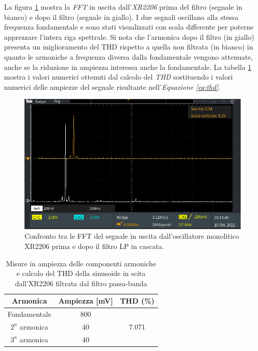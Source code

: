 \documentclass[titlepage]{report}
\begin{document}
	La figura \ref{fig:FFTxr+LP} mostra la \textit{FFT} in uscita dall'\textit{XR2206} prima del filtro (segnale in bianco) e dopo il filtro (segnale in giallo). I due segnali oscillano alla stessa frequenza fondamentale e sono stati visualizzati con scala differente per poterne apprezzare l'intera riga spettrale. Si nota che l'armonica dopo il filtro (in giallo) presenta un miglioramento del THD rispetto a quella non filtrata (in bianco) in quanto le armoniche a frequenza diversa dalla fondamentale vengono attenuate, anche se la riduzione in ampiezza interessa anche la fondamentale. La tabella \ref{tab:THD_XR2206+BP} mostra i valori numerici ottenuti dal calcolo del \textit{THD} sostituendo i valori numerici delle ampiezze del segnale risultante nell'\textit{Equazione \ref{eq:thd}}.

	\begin{figure}[H]
		\centering
		\includegraphics[scale=0.5]{Immagini/fft_xr+lp.PNG}
		\caption{Confronto tra le FFT del segnale in uscita dall'oscillatore monolitico XR2206 prima e dopo il filtro LP in cascata.}
		\label{fig:FFTxr+LP}
	\end{figure}


	\begin{table}[h!]
		\centering
		\begin{tabular}{||c|c|c||}
			\hline
			\cellcolor{gray!10}Armonica & \cellcolor{gray!10}Ampiezza [mV] & \cellcolor{gray!10}THD (\%) \\
			\hline
			Fondamentale & 800 &\\
			\cline{1-2}
			$2^a$ armonica & 40 & 7.071 \\
			\cline{1-2} 
			$3^a$ armonica & 40 & \\
			\hline	
		\end{tabular}
		\caption{Misure in ampiezza delle componenti armoniche e calcolo del THD della sinusoide in scita dall'XR2206 filtrata dal filtro passa-banda}
		\label{tab:THD_XR2206+BP}
	\end{table}
\end{document}
